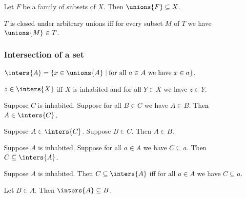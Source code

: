 \begin{proposition}\label{unions_family}
    Let $F$ be a family of subsets of $X$.
    Then $\unions{F}\subseteq X$.
\end{proposition}

\begin{abbreviation}\label{closedunderunions}
    $T$ is closed under arbitrary unions
    iff for every subset $M$ of $T$ we have $\unions{M}\in T$.
\end{abbreviation}

\subsubsection{Intersection of a set}

\begin{definition}\label{inters}
    $\inters{A} = \{ x\in\unions{A}\mid \text{for all $a\in A$ we have $x\in a$} \}$.
\end{definition}

\begin{proposition}\label{inters_iff_forall}
    $z\in\inters{X}$ iff $X$ is inhabited and for all $Y\in X$ we have $z\in Y$.
\end{proposition}

\begin{proposition}%
\label{inters_intro}
    Suppose $C$ is inhabited.
    Suppose for all $B\in C$ we have $A\in B$.
    Then $A\in\inters{C}$.
\end{proposition}

\begin{proposition}\label{inters_destr}
    Suppose $A\in\inters{C}$.
    Suppose $B\in C$.
    Then $A\in B$.
\end{proposition}

\begin{proposition}\label{inters_greatest}
    Suppose $A$ is inhabited.
    Suppose for all $a\in A$ we have $C\subseteq a$.
    Then $C\subseteq\inters{A}$.
\end{proposition}

\begin{proposition}\label{subseteq_inters_iff}
    Suppose $A$ is inhabited.
    Then $C\subseteq\inters{A}$ iff for all $a\in A$ we have $C\subseteq a$.
\end{proposition}

\begin{proposition}\label{inters_subseteq_elem}
    Let $B\in A$.
    Then $\inters{A}\subseteq B$.
\end{proposition}

